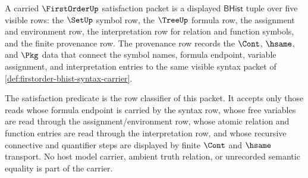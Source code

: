 \begin{definition}\label{def:firstorder-satisfaction-bhist-carrier}
A carried $\FirstOrderUp$ satisfaction packet is a displayed $\mathsf{BHist}$
tuple over five visible rows: the $\SetUp$ symbol row, the $\TreeUp$ formula
row, the assignment and environment row, the interpretation row for relation
and function symbols, and the finite provenance row. The provenance row records
the $\Cont$, $\hsame$, and $\Pkg$ data that connect the symbol names, formula
endpoint, variable assignment, and interpretation entries to the same visible
syntax packet of \autoref{def:firstorder-bhist-syntax-carrier}.

The satisfaction predicate is the row classifier of this packet. It accepts
only those reads whose formula endpoint is carried by the syntax row, whose
free variables are read through the assignment/environment row, whose atomic
relation and function entries are read through the interpretation row, and
whose recursive connective and quantifier steps are displayed by finite
$\Cont$ and $\hsame$ transport. No host model carrier, ambient truth relation,
or unrecorded semantic equality is part of the carrier.
\end{definition}

